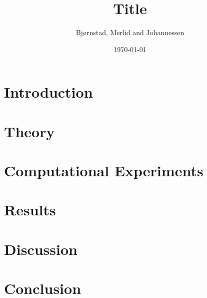 \documentclass[aps,rmp,reprint,amsmath,amssymb,longbibliography,twocolumn,floatfix]{revtex4-1}
\begin{document}
\title{Title}

\author{Bjørnstad, Merlid and Johannessen}
\date{\today}


\begin{abstract}

\end{abstract}
\maketitle

\tableofcontents

\section{Introduction}
\label{sec:introduction}

\section{Theory}


\section{Computational Experiments}

\section{Results}

\section{Discussion}

\section{Conclusion}

\newpage

\appendix
\label{appendix}

\end{document}
